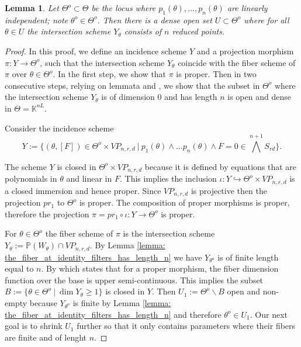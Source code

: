 \documentclass[final]{article}
\newcommand{\K}{\mathbb{K}}
\newcommand{\PP}{\mathbb{P}}
\theoremstyle{definition}
\theoremstyle{plain}
\newtheorem{lemma}[definition]{Lemma}
\begin{document}
\begin{lemma}\label{lemma: the_general_fiber_has_length_n}
    Let $\Theta^o \subset \Theta$ be the locus where $p_1(\theta), \dots, p_n(\theta)$ are linearly independent; note $\theta^o \in \Theta^o$.
    Then there is a dense open set $U\subset \Theta^o$ where for all $\theta \in U$ the intersection scheme $Y_\theta$ consists of $n$ reduced points.
\end{lemma}
\begin{proof}
    In this proof, we define an incidence scheme $Y$ and a projection morphism $\pi:Y\to \Theta^o$, such that the intersection scheme $Y_\theta$ coincide with the fiber scheme of $\pi$ over $\theta \in \Theta^o$. In the first step, we show that $\pi$ is proper. Then in two consecutive steps, relying on lemmata \cite[\href{https://stacks.math.columbia.edu/tag/0D4I}{Lemma 0D4I}]{stacks-project} and \cite[\href{https://stacks.math.columbia.edu/tag/07ZC}{Lemma 07ZC}]{stacks-project}, we show that the subset in $\Theta^o$ where the intersection scheme $Y_\theta$ is of dimension $0$ and has length $n$ is open and dense in $\Theta = \K^{nL}$.
    
    Consider the incidence scheme
    \[
    Y := \{(\theta, [F]) \in \Theta^o \times VP_{n,r,d}\ |\ p_1(\theta) \wedge \dots p_n(\theta) \wedge F = 0 \in \bigwedge^{n+1} S_{rd}\}.
    \]

    The scheme $Y$ is closed in $\Theta^o \times VP_{n,r,d}$ because it is defined by equations that are polynomials in $\theta$ and linear in $F$.
    This implies the inclusion $\iota: Y \hookrightarrow \Theta^o \times VP_{n,r,d}$ is a closed immersion and hence proper.
    Since $VP_{n,r,d}$ is projective then the projection $pr_1$ to $\Theta^o$ is proper.
    The composition of proper morphisms is proper, therefore the projection $\pi = pr_1 \circ \iota: Y \to \Theta^o$ is proper.

    For $\theta \in \Theta^o$ the fiber scheme of $\pi$ is the intersection scheme $Y_\theta := \PP(W_\theta) \cap VP_{n,r,d}$. By Lemma \ref{lemma: the_fiber_at_identity_filters_has_length_n} we have $Y_{\theta^o}$ is of finite length equal to $n$. 
    By \cite[\href{https://stacks.math.columbia.edu/tag/0D4I}{Lemma 0D4I}]{stacks-project} which states that for a proper morphism, the fiber dimension function over the base is upper semi-continuous.
    This implies the subset $B := \{\theta \in \Theta^o\ |\ \dim Y_{\theta} \geq 1\}$ is closed in $Y$. 
    Then $U_1 := \Theta^o \backslash B$ open and non-empty because $Y_{\theta^o}$ is finite by Lemma \ref{lemma: the_fiber_at_identity_filters_has_length_n} and therefore $\theta^o \in U_1$.
     Our next goal is to shrink $U_1$ further so that it only contains parameters where their fibers are finite and of lenght $n$.
     

\end{proof}
\end{document}
